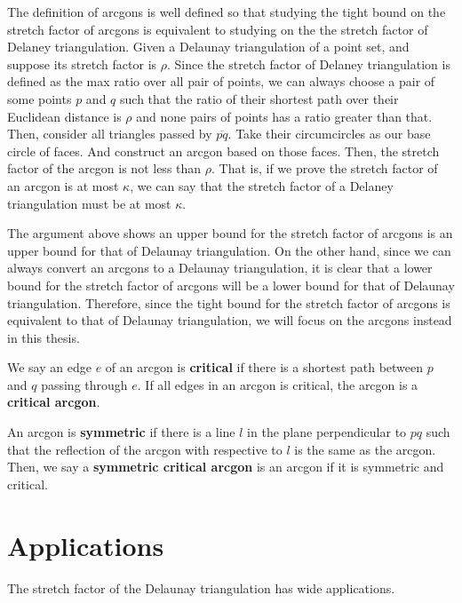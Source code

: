 The definition of arcgons is well defined so that studying the tight bound on the stretch factor of arcgons is equivalent to studying on the the stretch factor of Delaney triangulation. Given a Delaunay triangulation of a point set, and suppose its stretch factor is $\rho$. Since the stretch factor of Delaney triangulation is defined as the max ratio over all pair of points, we can always choose a pair of some points $p$ and $q$ such that the ratio of their shortest path over their Euclidean distance is $\rho$ and none pairs of points has a ratio greater than that. Then, consider all triangles passed by $\overline{pq}$. Take their circumcircles as our base circle of faces. And construct an arcgon based on those faces. Then, the stretch factor of the arcgon is not less than $\rho$. That is, if we prove the stretch factor of an arcgon is at most $\kappa$, we can say that the stretch factor of a Delaney triangulation must be at most $\kappa$. 


The argument above shows an upper bound for the stretch factor of arcgons is an upper bound for that of Delaunay triangulation. On the other hand, since we can always convert an arcgons to a Delaunay triangulation, it is clear that a lower bound for the stretch factor of arcgons will be a lower bound for that of Delaunay triangulation. Therefore, since the tight bound for the stretch factor of arcgons is equivalent to that of Delaunay triangulation, we will focus on the arcgons instead in this thesis.




We say an edge $e$ of an arcgon is \textbf{critical} if there is a shortest path between $p$ and $q$ passing through $e$. If all edges in an arcgon is critical, the arcgon is a \textbf{critical arcgon}. 



An arcgon is \textbf{symmetric} if there is a line $l$ in the plane perpendicular to $pq$ such that the reflection of the arcgon with respective to $l$ is the same as the arcgon. Then, we say a \textbf{symmetric critical arcgon} is an arcgon if it is symmetric and critical.









\section{Applications}
The stretch factor of the Delaunay triangulation has wide applications.
